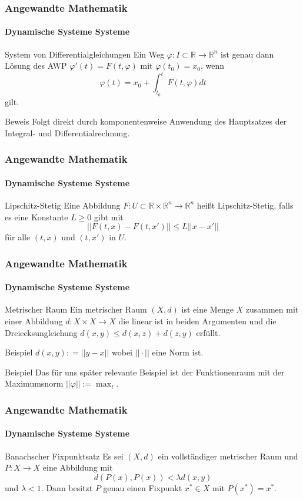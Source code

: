 \documentclass{beamer}
\begin{document}
\begin{frame}
    \frametitle{Angewandte Mathematik}
\framesubtitle{Dynamische Systeme Systeme}
\begin{block}{System von Differentialgleichungen}
Ein Weg $\varphi : I \subset \mathbb{R} \to \mathbb{R}^n$ ist genau dann Lösung des AWP $\varphi'(t) = F(t , \varphi)$ mit $ \varphi(t_0)= x_0$, wenn
$$ \varphi(t) =  x_0 + \int_{t_0}^{t} F(t, \varphi) dt$$
gilt.
\end{block}
\begin{block}{Beweis}
Folgt direkt durch komponentenweise Anwendung des Hauptsatzes der Integral- und Differentialrechnung.
\end{block}
 \end{frame}


\begin{frame}
    \frametitle{Angewandte Mathematik}
\framesubtitle{Dynamische Systeme Systeme}
\begin{block}{Lipschitz-Stetig}
Eine  Abbildung $F : U \subset \mathbb{R} \times \mathbb{R}^n \to \mathbb{R}^n$ heißt Lipschitz-Stetig,
falls es eine Konstante $L \geq 0$ gibt  mit
$$ || F(t,x) - F(t,x') ||  \leq L || x -x' ||  $$
für alle $(t,x)$ und $(t,x')$ in $U$.
\end{block}

 \end{frame}


\begin{frame}
    \frametitle{Angewandte Mathematik}
\framesubtitle{Dynamische Systeme Systeme}
\begin{block}{Metrischer Raum}
Ein metrischer Raum $(X,d)$ ist eine Menge $X$ zusammen mit einer Abbildung $d : X \times X \to X$ die linear ist in beiden Argumenten und die Dreiecksungleichung $d(x,y) \leq d(x,z) + d(z,y)$ erfüllt.  
\end{block}
\begin{block}{Beispiel}
$d(x,y) : = || y- x  ||$  wobei $||  \cdot ||$  eine Norm ist. 
\end{block}

\begin{block}{Beispiel}
Das für uns später relevante Beispiel ist der Funktionenraum mit der Maximumsnorm $|| \varphi || := \max_t$.
\end{block}
 \end{frame}


\begin{frame}
    \frametitle{Angewandte Mathematik}
\framesubtitle{Dynamische Systeme Systeme}
\begin{block}{Banachscher Fixpunktsatz}
Es sei $(X,d)$ ein vollständiger metrischer Raum und $P: X \to X$ eine Abbildung mit $$d(P(x), P(x)) < \lambda d(x,y)$$ und $\lambda < 1$. Dann besitzt $P$ genau einen Fixpunkt $x^* \in X$ mit $P(x^*) = x^*$.

\end{block}

 \end{frame}
\end{document}
